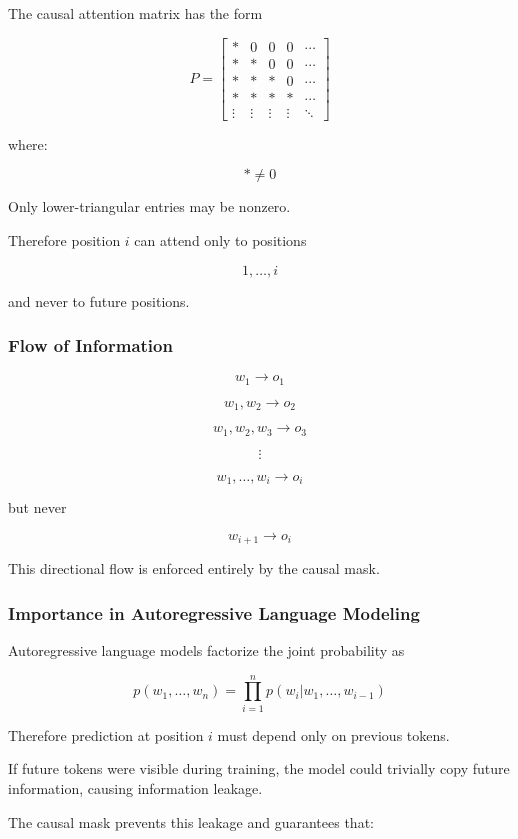 \documentclass[12pt]{article}
\begin{document}
The causal attention matrix has the form

\[
P
=
\begin{bmatrix}
\ast & 0 & 0 & 0 & \cdots \\
\ast & \ast & 0 & 0 & \cdots \\
\ast & \ast & \ast & 0 & \cdots \\
\ast & \ast & \ast & \ast & \cdots \\
\vdots & \vdots & \vdots & \vdots & \ddots
\end{bmatrix}
\]

where:

\[
\ast \neq 0
\]

Only lower-triangular entries may be nonzero.

Therefore position \(i\) can attend only to positions

\[
1,\dots,i
\]

and never to future positions.

\subsubsection*{Flow of Information}

\[
w_1 \rightarrow o_1
\]

\[
w_1,w_2 \rightarrow o_2
\]

\[
w_1,w_2,w_3 \rightarrow o_3
\]

\[
\vdots
\]

\[
w_1,\dots,w_i \rightarrow o_i
\]

but never

\[
w_{i+1}\rightarrow o_i
\]

This directional flow is enforced entirely by the causal mask.

\subsubsection*{Importance in Autoregressive Language Modeling}

Autoregressive language models factorize the joint probability as

\[
p(w_1,\dots,w_n)
=
\prod_{i=1}^n p(w_i|w_1,\dots,w_{i-1})
\]

Therefore prediction at position \(i\) must depend only on previous tokens.

If future tokens were visible during training, the model could trivially copy future information, causing information leakage.

The causal mask prevents this leakage and guarantees that:
\end{document}
